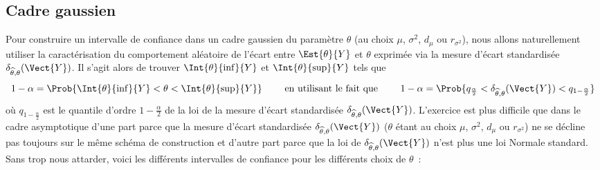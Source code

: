 \documentclass[10pt]{article}
\begin{document}
\subsection{Cadre gaussien}
Pour construire un intervalle de confiance dans un cadre gaussien du param{\`e}tre $\theta$ (au choix $\mu$, $\sigma^2$, $d_{\mu}$ ou $r_{\sigma^2}$), nous allons naturellement utiliser la caract{\'e}risation du comportement al{\'e}atoire de l'{\'e}cart entre $\Est{\theta}{Y}$ et $\theta$ exprim{\'e}e via la mesure d'{\'e}cart standardis{\'e}e $\delta_{\widehat{\theta},\theta}(\Vect{Y})$. Il s'agit alors de trouver $\Int{\theta}{\inf}{Y}$ et  $\Int{\theta}{\sup}{Y}$ tels que 
\[
1-\alpha=\Prob{ \Int{\theta}{\inf}{Y} < \theta < \Int{\theta}{\sup}{Y}}
\qquad 
\mbox{ en utilisant le fait que }
\qquad
1-\alpha=\Prob{ q_{\frac\alpha2} < \delta_{\widehat{\theta},\theta}(\Vect{Y}) < q_{1-{\frac{\alpha}2}}}
\]
o{\`u} $q_{1-\frac{\alpha}2}$ est le quantile d'ordre $1-\frac{\alpha}2$ de la loi de la mesure d'{\'e}cart standardis{\'e}e $\delta_{\widehat{\theta},\theta}(\Vect{Y})$. L'exercice est plus difficile que dans le cadre asymptotique d'une part parce que la mesure d'{\'e}cart standardis{\'e}e $\delta_{\widehat{\theta},\theta}(\Vect{Y})$ ($\theta$ {\'e}tant au choix $\mu$, $\sigma^2$, $d_{\mu}$ ou $r_{\sigma^2}$) ne se d{\'e}cline pas toujours sur le m{\^e}me sch{\'e}ma de construction et d'autre part parce que la loi de  $\delta_{\widehat{\theta},\theta}(\Vect{Y})$ n'est plus une loi Normale standard. Sans trop nous attarder, voici les diff{\'e}rents intervalles de confiance pour les diff{\'e}rents choix de $\theta$~: 
\end{document}
